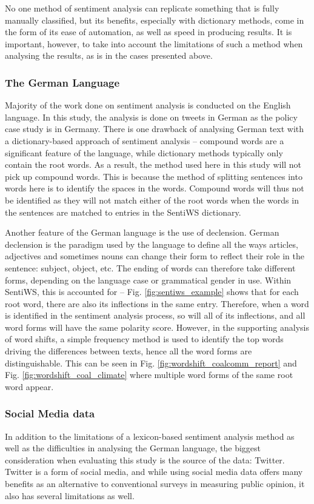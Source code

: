 \documentclass[12pt,onecolumn,twoside]{layout}
\begin{document}
No one method of sentiment analysis can replicate something that is fully manually classified, but its benefits, especially with dictionary methods, come in the form of its ease of automation, as well as speed in producing results. It is important, however, to take into account the limitations of such a method when analysing the results, as is in the cases presented above.

\subsubsection*{The German Language}
Majority of the work done on sentiment analysis is conducted on the English language. In this study, the analysis is done on tweets in German as the policy case study is in Germany. There is one drawback of analysing German text with a dictionary-based approach of sentiment analysis -- compound words are a significant feature of the language, while dictionary methods typically only contain the root words. As a result, the method used here in this study will not pick up compound words. This is because the method of splitting sentences into words here is to identify the spaces in the words. Compound words will thus not be identified as they will not match either of the root words when the words in the sentences are matched to entries in the SentiWS dictionary.

Another feature of the German language is the use of declension. German declension is the paradigm used by the language to define all the ways articles, adjectives and sometimes nouns can change their form to reflect their role in the sentence: subject, object, etc. The ending of words can therefore take different forms, depending on the language case or grammatical gender in use. Within SentiWS, this is accounted for -- Fig. \ref{fig:sentiws_example} shows that for each root word, there are also its inflections in the same entry. Therefore, when a word is identified in the sentiment analysis process, so will all of its inflections, and all word forms will have the same polarity score. However, in the supporting analysis of word shifts, a simple frequency method is used to identify the top words driving the differences between texts, hence all the word forms are distinguishable. This can be seen in Fig. \ref{fig:wordshift_coalcomm_report} and Fig. \ref{fig:wordshift_coal_climate} where multiple word forms of the same root word appear.

\subsubsection*{Social Media data}
In addition to the limitations of a lexicon-based sentiment analysis method as well as the difficulties in analysing the German language, the biggest consideration when evaluating this study is the source of the data: Twitter. Twitter is a form of social media, and while using social media data offers many benefits as an alternative to conventional surveys in measuring public opinion, it also has several limitations as well.
\end{document}
